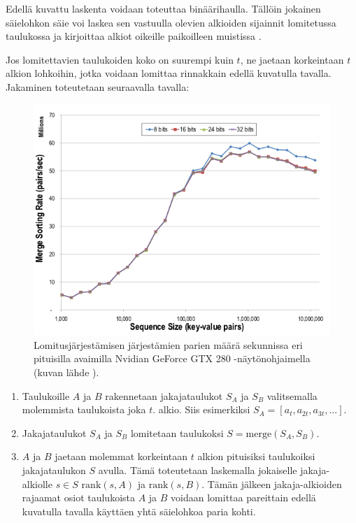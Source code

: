 \documentclass[a4paper,11pt]{article}
\begin{document}
Edellä kuvattu laskenta voidaan toteuttaa binäärihaulla. Tällöin jokainen säielohkon säie voi laskea sen vastuulla olevien alkioiden sijainnit lomitetussa taulukossa ja kirjoittaa alkiot oikeille paikoilleen muistissa \cite{satish2009}.

Jos lomitettavien taulukoiden koko on suurempi kuin $t$, ne jaetaan korkeintaan $t$ alkion lohkoihin, jotka voidaan lomittaa rinnakkain edellä kuvatulla tavalla. Jakaminen toteutetaan seuraavalla tavalla:

\begin{figure}
\centering
\includegraphics[scale = 0.45]{satish_mergesort}
\caption{Lomitusjärjestämisen järjestämien parien määrä sekunnissa eri pituisilla avaimilla Nvidian GeForce GTX 280 -näytönohjaimella (kuvan lähde \cite{satish2009}).}
\label{fig:merge_sort_varying_key_size}
\end{figure}

\begin{singlespace*}
\begin{enumerate}
\item Taulukoille $A$ ja $B$ rakennetaan jakajataulukot $S_A$ ja $S_B$ valitsemalla molemmista taulukoista joka $t$. alkio. Siis esimerkiksi $S_A = [a_t, a_{2t}, a_{3t}, ...]$.
\item Jakajataulukot $S_A$ ja $S_B$ lomitetaan taulukoksi $S = \mathrm{merge}(S_A, S_B)$.
\item $A$ ja $B$ jaetaan molemmat korkeintaan $t$ alkion pituisiksi taulukoiksi jakajataulukon $S$ avulla. Tämä toteutetaan laskemalla jokaiselle jakaja-alkiolle $s \in S$ $\mathrm{rank}(s, A)$ ja $\mathrm{rank}(s, B)$. Tämän jälkeen jakaja-alkioiden rajaamat osiot taulukoista $A$ ja $B$ voidaan lomittaa pareittain edellä kuvatulla tavalla käyttäen yhtä säielohkoa paria kohti.
\end{enumerate}
\end{singlespace*}
\end{document}
